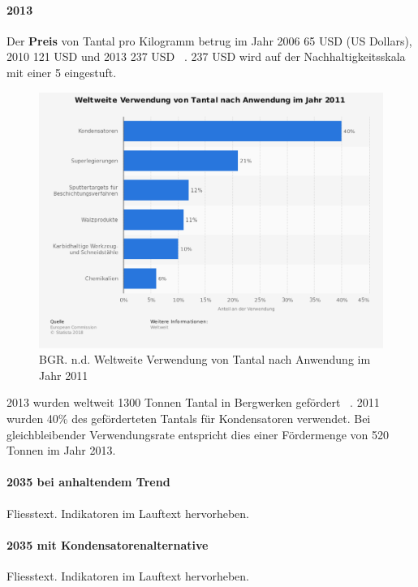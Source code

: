 \paragraph{2013}
Der \textbf{Preis} von Tantal pro Kilogramm betrug im Jahr 2006 65 USD (US Dollars), 2010 121 USD und 2013 237 USD ~\cite{tantal_price2}. 237 USD wird auf der Nachhaltigkeitsskala mit einer 5 eingestuft. 
\\
\begin{figure}[htp]
\centering
\includegraphics[scale=2.0]{images/tantal_usage_2011.png}
\caption{BGR. n.d. Weltweite Verwendung von Tantal nach Anwendung im Jahr 2011 ~\cite{tantal_usage}}
\label{}
\end{figure}

2013 wurden weltweit 1300 Tonnen Tantal in Bergwerken gefördert ~\cite{tantal_price2}. 2011 wurden 40\% des geförderteten Tantals für Kondensatoren verwendet. Bei gleichbleibender Verwendungsrate entspricht dies einer Fördermenge von 520 Tonnen im Jahr 2013.
\\


\paragraph{2035 bei anhaltendem Trend}
Fliesstext. Indikatoren im Lauftext hervorheben.

\paragraph{2035 mit Kondensatorenalternative}
Fliesstext. Indikatoren im Lauftext hervorheben.

